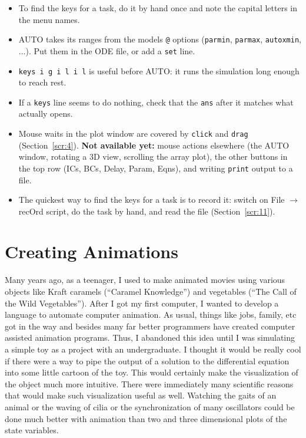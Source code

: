 \documentclass{article}
\providecommand{\tightlist}{\setlength{\itemsep}{0pt}\setlength{\parskip}{0pt}}
\begin{document}
\begin{itemize}
\tightlist
\item
  To find the keys for a task, do it by hand once and note the capital
  letters in the menu names.
\item
  AUTO takes its ranges from the model\textquotesingle s \texttt{@} options
  (\texttt{parmin}, \texttt{parmax}, \texttt{autoxmin}, ...).
  Put them in the ODE file, or add a \texttt{set} line.
\item
  \texttt{keys\ i\ g\ i\ l\ i\ l} is useful before AUTO: it runs the
  simulation long enough to reach rest.
\item
  If a \texttt{keys} line seems to do nothing, check that the
  \texttt{ans} after it matches what actually opens.
\item
  Mouse waits in the plot window are covered by \texttt{click} and
  \texttt{drag} (Section~\ref{scr:4}). \textbf{Not available yet:} mouse
  actions elsewhere (the AUTO window, rotating a 3D view, scrolling the
  array plot), the other buttons in the top row (ICs, BCs, Delay, Param,
  Eqns), and writing \texttt{print} output to a file.
\item
  The quickest way to find the keys for a task is to record it: switch
  on File $\rightarrow$ recOrd script, do the task by hand, and read the file
  (Section~\ref{scr:11}).
\end{itemize}

\section{Creating Animations}
\label{toon}
Many years ago, as a teenager, I used to make animated movies using
various objects like Kraft caramels (``Caramel Knowledge'') and
vegetables (``The Call of the Wild Vegetables'').  After I got my
first computer, I wanted to develop a language to automate computer
animation. As usual, things like jobs, family, etc got in the way and
besides many far better programmers have created computer assisted
animation programs.  Thus, I abandoned this idea until I was
simulating a simple toy as a project with an undergraduate.  I thought
it would be really cool if there were a way to pipe the output of a
solution to the differential equation into some little cartoon of the
toy. This would certainly make the visualization of the object much
more intuitive. There were immediately many scientific reasons that
would make such visualization useful as well. Watching the gaits of an
animal or the waving of cilia or the synchronization of many
oscillators could be done much better with animation
than two and three dimensional plots of the state variables. 
 
\end{document}
